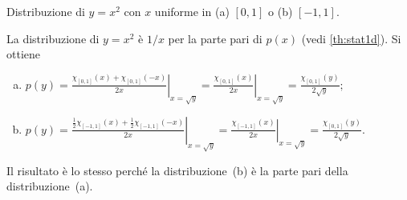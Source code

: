 \begin{exercise}
	Distribuzione di $y=x^2$ con $x$ uniforme in (a) $[0,1]$ o (b) $[-1,1]$.
\end{exercise}

\begin{solution}
	La distribuzione di $y=x^2$ è $1/x$ per la parte pari di $p(x)$ (vedi \autoref{th:stat1d}). Si ottiene
	\begin{enumerate}[(a)]
		\item
			$\displaystyle p(y) = \left.\frac{\chi_{[0,1]}(x) + \chi_{[0,1]}(-x)}{2x}\right|_{x=\sqrt y}
			= \left.\frac{\chi_{[0,1]}(x)}{2x}\right|_{x=\sqrt y}
			= \frac{\chi_{[0,1]}(y)}{2\sqrt y};$
		\item
			$\displaystyle p(y) = \left.\frac{\frac12\chi_{[-1,1]}(x) + \frac12\chi_{[-1,1]}(-x)}{2x}\right|_{x=\sqrt y}
			= \left.\frac{\chi_{[-1,1]}(x)}{2x}\right|_{x=\sqrt y}
			= \frac{\chi_{[0,1]}(y)}{2\sqrt y}.$
	\end{enumerate}
	Il risultato è lo stesso perché la distribuzione~(b) è la parte pari della distribuzione~(a).
\end{solution}
